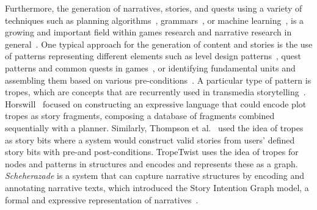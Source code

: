 Furthermore, the generation of narratives, stories, and quests using a variety of techniques such as planning algorithms~\cite{p12Riedl2006-StoryPlanningCreativity,young2013-plansNarrGen}, grammars~\cite{p12hartsook2011-storyWorlds,Alvarez2021-questgram}, or machine learning~\cite{p12tambwekar2019-controllableNeuralStory,vanstegeren2021-gpt2quests}, is a growing and important field within games research and narrative research in general~\cite{p12Gervas2009-ComputationalStoryCreativity,kybartas2016survey,yu2020quest,Eladhari2014-storymakinggames}. One typical approach for the generation of content and stories is the use of patterns representing different elements such as level design patterns~\cite{p12alvarez2019empowering,flodtol2020-WIPMakeSenseDungs}, quest patterns and common quests in games~\cite{p12Trenton2010-questpatterns,Doran2011-questsMMORPGs}, or identifying fundamental units and assembling them based on various pre-conditions~\cite{p12Kreminski2018-SketchingStorylets,Garbe2019-StoryletsAssembler}. A particular type of pattern is tropes, which are concepts that are recurrently used in transmedia storytelling~\cite{p12tropesSimpsons,tvtropes}. Horswill~\cite{p12Horswill2016-DearLeaderTrope} focused on constructing an expressive language that could encode plot tropes as story fragments, composing a database of fragments combined sequentially with a planner. Similarly, Thompson et al.~\cite{p12Thompson2018-usingTropesNarrativeEvents} used the idea of tropes as story bits where a system would construct valid stories from users' defined story bits with pre-and post-conditions. TropeTwist uses the idea of tropes for nodes and patterns in structures and encodes and represents these as a graph. \emph{Scheherazade} is a system that can capture narrative structures by encoding and annotating narrative texts, which introduced the Story Intention Graph model, a formal and expressive representation of narratives~\cite{p12elson-2012-dramabank}.








